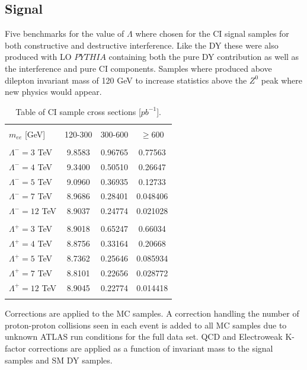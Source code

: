 \subsection{Signal} 
Five benchmarks for the value of $\Lambda$ where chosen for the CI signal samples for both constructive and destructive interference. Like the DY these were also produced with LO $PYTHIA$ containing both the pure DY contribution as well as the interference and pure CI components. Samples where produced above dilepton invariant mass of 120 GeV to increase statistics above the $Z^{0}$ peak where new physics would appear. 

\begin{table}[h!]
\centering %
\begin{tabular}{l ccc} %
\hline\hline \\[-2ex] %
$m_{ee}$ [GeV] & 120-300 & 300-600 & $\geq 600$ \\ [0.2ex]
\hline  \\[-2ex] %
$\Lambda^{-} = 3$ TeV & 9.8583 & 0.96765 & 0.77563 \\ 
$\Lambda^{-} = 4$ TeV & 9.3400 & 0.50510 & 0.26647 \\ 
$\Lambda^{-} = 5$ TeV & 9.0960 & 0.36935 & 0.12733 \\  
$\Lambda^{-} = 7$ TeV & 8.9686 & 0.28401 & 0.048406 \\  
$\Lambda^{-} = 12$ TeV & 8.9037 & 0.24774 & 0.021028 \\ 
\hline  \\[-2ex] %
$\Lambda^{+} = 3$ TeV & 8.9018 & 0.65247 & 0.66034 \\ 
$\Lambda^{+} = 4$ TeV & 8.8756 & 0.33164 & 0.20668 \\  
$\Lambda^{+} = 5$ TeV & 8.7362 & 0.25646 & 0.085934 \\ 
$\Lambda^{+} = 7$ TeV & 8.8101 & 0.22656 & 0.028772 \\ 
$\Lambda^{+} = 12$ TeV & 8.9045 & 0.22774 & 0.014418 \\ 
\hline\hline  \\ %
\end{tabular}
\caption{Table of CI sample cross sections [$pb^{-1}$].} %
\label{tab:CIyeilds}
\end{table}

Corrections are applied to the MC samples. A correction handling the number of proton-proton collisions seen in each event is added to all MC samples due to unknown ATLAS run conditions for the full data set. QCD and Electroweak K-factor corrections are applied as a function of invariant mass to the signal samples and SM DY samples. %











